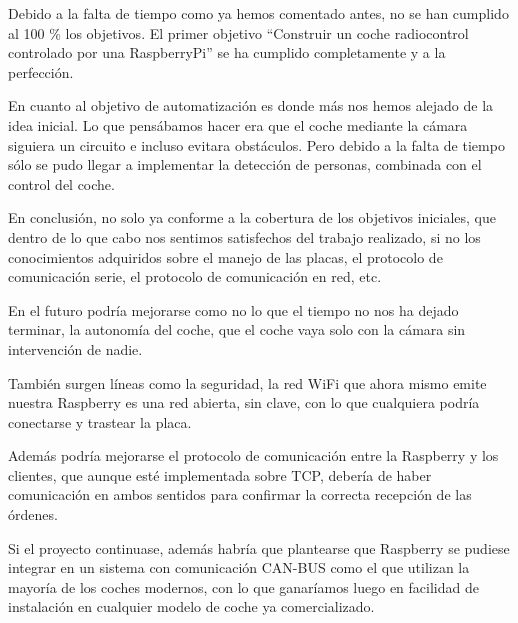 \documentclass{pclass}
\begin{document}

	Debido a la falta de tiempo como ya hemos comentado antes, no se han cumplido al 100 \% los objetivos. El primer objetivo ``Construir un coche radiocontrol controlado por una RaspberryPi'' se ha cumplido completamente y a la perfección.
	
	En cuanto al objetivo de automatización es donde más nos hemos alejado de la idea inicial. Lo que pensábamos hacer era que el coche mediante la cámara siguiera un circuito e incluso evitara obstáculos. Pero debido a la falta de tiempo sólo se pudo llegar a implementar la detección de personas, combinada con el control del coche.
	
	En conclusión, no solo ya conforme a la cobertura de los objetivos iniciales, que dentro de lo que cabo nos sentimos satisfechos del trabajo realizado, si no los conocimientos adquiridos sobre el manejo de las placas, el protocolo de comunicación serie, el protocolo de comunicación en red, etc. 



	En el futuro podría mejorarse como no lo que el tiempo no nos ha dejado terminar, la autonomía del coche, que el coche vaya solo con la cámara sin intervención de nadie. 
	
	También surgen líneas como la seguridad, la red WiFi que ahora mismo emite nuestra Raspberry es una red abierta, sin clave, con lo que cualquiera podría conectarse y trastear la placa. 
	
	Además podría mejorarse el protocolo de comunicación entre la Raspberry y los clientes, que aunque esté implementada sobre TCP, debería de haber comunicación en ambos sentidos para confirmar la correcta recepción de las órdenes.
	
	Si el proyecto continuase, además habría que plantearse que Raspberry se pudiese integrar en un sistema con comunicación CAN-BUS como el que utilizan la mayoría de los coches modernos, con lo que ganaríamos luego en facilidad de instalación en cualquier modelo de coche ya comercializado.


	
	
	 
	


\end{document}
